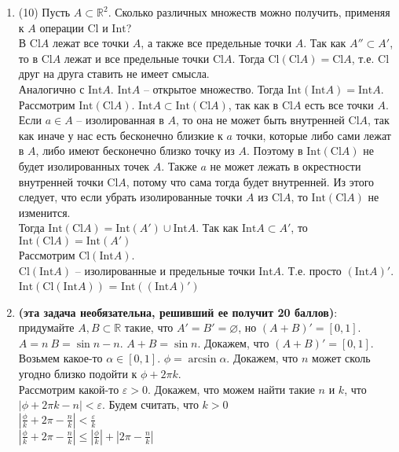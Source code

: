 \documentclass[a4paper]{article}
\def\eps{\varepsilon}
\def\Int{\mathrm{Int}}
\def\Cl{\mathrm{Cl}}
\begin{document}
\begin{enumerate}
    \item (10) Пусть $A\subset \mathbb R^2$. Сколько различных множеств можно получить, применяя к $A$ операции $\Cl$ и $\Int$?\\
    В $\Cl A$ лежат все точки $A$, а также все предельные точки $A$. Так как $A'' \subset A'$, то в $\Cl A$ лежат и все предельные точки $\Cl A$. Тогда $\Cl(\Cl A) = \Cl A$, т.е. $\Cl$ друг на друга ставить не имеет смысла.\\
    Аналогично с $\Int A$. $\Int A$ -- открытое множество. Тогда $\Int(\Int A) = \Int A$.\\
    Рассмотрим $\Int(\Cl A)$. $\Int A \subset \Int(\Cl A)$, так как в $\Cl A$ есть все точки $A$.\\
    Если $a \in A$ -- изолированная в $A$, то она не может быть внутренней $\Cl A$, так как иначе у нас есть бесконечно близкие к $a$ точки, которые либо сами лежат в $A$, либо имеют бесконечно близко точку из $A$. Поэтому в $\Int(\Cl A)$ не будет изолированных точек $A$. Также $a$ не может лежать в окрестности внутренней точки $\Cl A$, потому что сама тогда будет внутренней. Из этого следует, что если убрать изолированные точки $A$ из $\Cl A$, то $\Int (\Cl A)$ не изменится.\\
    Тогда $\Int(\Cl A) = \Int (A') \cup \Int A$. Так как $\Int A\subset A'$, то $\Int(\Cl A) = \Int (A')$\\
    Рассмотрим $\Cl(\Int A)$.\\
    $\Cl(\Int A)$ -- изолированные и предельные точки $\Int A$. Т.е. просто $(\Int A)'$.\\
    $\Int(\Cl(\Int A))$ = $\Int((\Int A)')$\\

    
    \item \textbf{(эта задача необязательна, решивший ее получит 20 баллов)}: придумайте $A,B\subset \mathbb R$ такие, что $A' = B' = \varnothing$, но $(A+B)' = [0,1]$.\\
    $A = n\ B = \sin n - n$. $A + B = \sin n$. Докажем, что $(A + B)' = [0, 1]$. Возьмем какое-то $\alpha \in [0, 1]$. $\phi = \arcsin \alpha$. Докажем, что $n$ может сколь угодно близко подойти к $\phi + 2\pi k$.\\
    Рассмотрим какой-то $\eps > 0$. Докажем, что можем найти такие $n$ и $k$, что $|\phi + 2\pi k - n| < \eps$. Будем считать, что $k > 0$\\
    $|\frac{\phi}{k} + 2\pi - \frac{n}{k}| < \frac{\eps}{k}$\\
    $|\frac{\phi}{k} + 2\pi - \frac{n}{k}| \le |\frac{\phi}{k}| + |2\pi - \frac{n}{k}|$
\end{enumerate}
\end{document}

